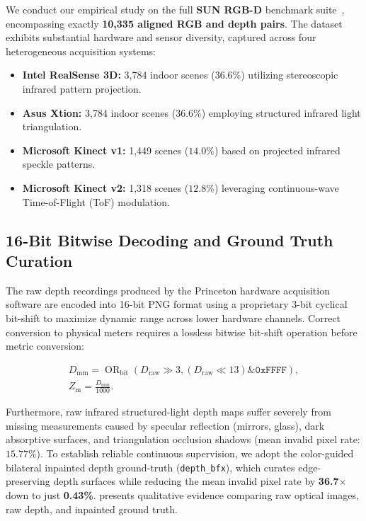 \documentclass[twoside,final]{hcmut-report}
\begin{document}
We conduct our empirical study on the full \textbf{SUN RGB-D} benchmark suite~\cite{song2015sun}, encompassing exactly \textbf{10,335 aligned RGB and depth pairs}. The dataset exhibits substantial hardware and sensor diversity, captured across four heterogeneous acquisition systems:

\begin{itemize}

  \item \textbf{Intel RealSense 3D:} 3,784 indoor scenes ($36.6\%$) utilizing stereoscopic infrared pattern projection.

  \item \textbf{Asus Xtion:} 3,784 indoor scenes ($36.6\%$) employing structured infrared light triangulation.

  \item \textbf{Microsoft Kinect v1:} 1,449 scenes ($14.0\%$) based on projected infrared speckle patterns.

  \item \textbf{Microsoft Kinect v2:} 1,318 scenes ($12.8\%$) leveraging continuous-wave Time-of-Flight (ToF) modulation.

\end{itemize}

\subsection{16-Bit Bitwise Decoding and Ground Truth Curation}

The raw depth recordings produced by the Princeton hardware acquisition software are encoded into 16-bit PNG format using a proprietary 3-bit cyclical bit-shift to maximize dynamic range across lower hardware channels. Correct conversion to physical meters requires a lossless bitwise bit-shift operation before metric conversion:

\begin{equation}
\begin{gathered}
D_{\mathrm{mm}}=\operatorname{OR}_{\mathrm{bit}}\!\left(
D_{\mathrm{raw}}\gg3,
(D_{\mathrm{raw}}\ll13)\mathbin{\&}\mathtt{0xFFFF}
\right),\\
Z_{\mathrm{m}}=\frac{D_{\mathrm{mm}}}{1000}.
\end{gathered}
\end{equation}

Furthermore, raw infrared structured-light depth maps suffer severely from missing measurements caused by specular reflection (mirrors, glass), dark absorptive surfaces, and triangulation occlusion shadows (mean invalid pixel rate: $15.77\%$). To establish reliable continuous supervision, we adopt the color-guided bilateral inpainted depth ground-truth (\texttt{depth\_bfx}), which curates edge-preserving depth surfaces while reducing the mean invalid pixel rate by \textbf{36.7$\times$} down to just \textbf{0.43\%}.  presents qualitative evidence comparing raw optical images, raw depth, and inpainted ground truth.
\end{document}
